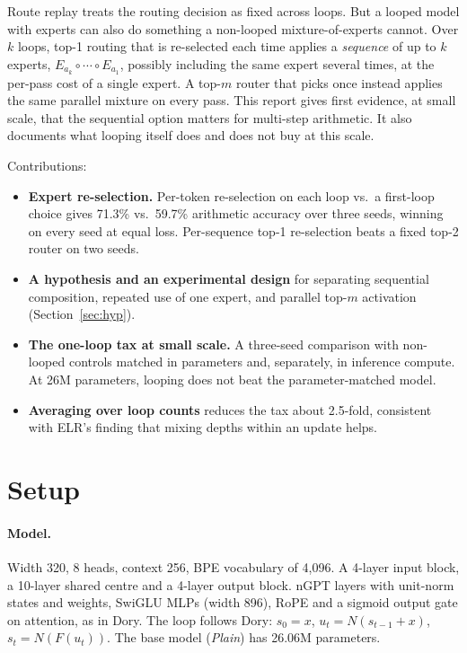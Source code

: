 \documentclass[11pt]{article}
\begin{document}
Route replay treats the routing decision as fixed across loops. But a looped model with experts can also do something a non-looped mixture-of-experts cannot. Over $k$ loops, top-1 routing that is re-selected each time applies a \emph{sequence} of up to $k$ experts, $E_{a_k}\circ\cdots\circ E_{a_1}$, possibly including the same expert several times, at the per-pass cost of a single expert. A top-$m$ router that picks once instead applies the same parallel mixture on every pass. This report gives first evidence, at small scale, that the sequential option matters for multi-step arithmetic. It also documents what looping itself does and does not buy at this scale.

Contributions:
\begin{itemize}\setlength\itemsep{1pt}
\item \textbf{Expert re-selection.} Per-token re-selection on each loop vs.\ a first-loop choice gives 71.3\% vs.\ 59.7\% arithmetic accuracy over three seeds, winning on every seed at equal loss. Per-sequence top-1 re-selection beats a fixed top-2 router on two seeds.
\item \textbf{A hypothesis and an experimental design} for separating sequential composition, repeated use of one expert, and parallel top-$m$ activation (Section~\ref{sec:hyp}).
\item \textbf{The one-loop tax at small scale.} A three-seed comparison with non-looped controls matched in parameters and, separately, in inference compute. At 26M parameters, looping does not beat the parameter-matched model.
\item \textbf{Averaging over loop counts} reduces the tax about 2.5-fold, consistent with ELR's finding that mixing depths within an update helps.
\end{itemize}

\section{Setup}
\paragraph{Model.} Width 320, 8 heads, context 256, BPE vocabulary of 4{,}096. A 4-layer input block, a 10-layer shared centre and a 4-layer output block. nGPT layers \cite{ngpt} with unit-norm states and weights, SwiGLU MLPs (width 896), RoPE and a sigmoid output gate on attention, as in Dory. The loop follows Dory: $s_0=x$, $u_t=N(s_{t-1}+x)$, $s_t=N(F(u_t))$. The base model (\emph{Plain}) has 26.06M parameters.
\end{document}
